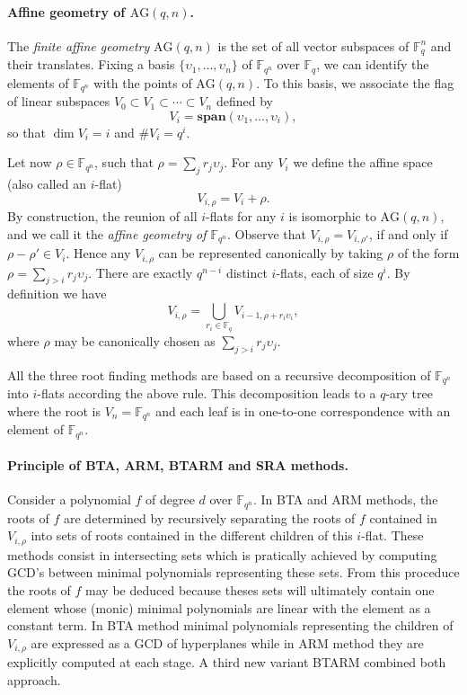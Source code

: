 \documentclass{article}
\newcommand{\ff}[1]{\mathbb{F}_{#1}}
\newcommand{\dd}{d}
\newcommand{\qq}{q}
\newcommand{\nn}{n}
\newcommand{\qn}{{\qq^\nn}}
\newcommand{\basef}{\ff{\qq}}
\newcommand{\extf}{\ff{\qn}}
\newcommand{\AG}{\mathrm{AG}(\qq,\nn)}
\newcommand{\Span}{\mathbf{span}}
\newcommand{\card}[1]{\# #1}
\begin{document}
\paragraph{Affine geometry of $\AG$.} The \emph{finite affine geometry} $\AG$ is the set of all vector subspaces of $\basef^\nn$ and their translates. Fixing a basis $\{\upsilon_1,\ldots,\upsilon_\nn\}$ of $\extf$ over $\basef$, we can
identify the elements of $\extf$ with the points of $\AG$. To this basis, we associate the flag of linear
subspaces $V_0\subset V_1\subset \cdots \subset V_\nn$ defined by
\begin{equation}
  V_i = \Span(\upsilon_1,\dots,\upsilon_i),
\end{equation}
so that $\dim V_i = i$ and $\card V_i = \qq^i$.

Let now $\rho\in\extf$, such that $\rho=\sum_j r_j\upsilon_j$.  For any
$V_i$ we define the affine space (also called an $i$-flat)
\begin{equation}
  V_{i,\rho} = V_i + \rho.
\end{equation}
By construction, the reunion of all $i$-flats for any $i$ is
isomorphic to $\AG$, and we call it the \emph{affine geometry of
  $\extf$}.
Observe that $V_{i,\rho}=V_{i,\rho'}$, if and only if $\rho-\rho'\in V_i$. Hence
any $V_{i,\rho}$ can be represented canonically by taking $\rho$ of
the form $\rho=\sum_{j>i}r_j\upsilon_j$. There are exactly
$\qq^{n-i}$ distinct $i$-flats, each of size $\qq^i$. By definition we have
\begin{equation}
  V_{i,\rho} = \bigcup_{r_i \in\basef} V_{i-1,\rho + r_i \upsilon_i},
\end{equation}
where $\rho$ may be canonically chosen as $\sum_{j>i}r_j\upsilon_j$.

\medskip

\noindent All the three root finding methods are based on a recursive decomposition of $\extf$ into $i$-flats 
according the above rule. This decomposition leads to a $\qq$-ary tree where the root 
is $V_{n}=\extf$ and each leaf is in one-to-one correspondence with an element of $\extf$.

\medskip


\paragraph{Principle of BTA, ARM, BTARM and SRA methods.} Consider a polynomial $f$ of degree $\dd$ over $\extf$. In BTA and ARM methods, the roots of $f$ are determined by recursively separating the roots of $f$ contained in $V_{i,\rho}$ into sets of roots contained in the different children of this $i$-flat. These methods consist in intersecting sets which is pratically achieved by computing GCD's between minimal polynomials representing these sets. From this proceduce the roots of $f$ may be deduced because 
theses sets will ultimately contain one element whose (monic) minimal polynomials are linear with the element as a constant term. In BTA method minimal polynomials representing the children of $V_{i,\rho}$ 
are expressed as a GCD of hyperplanes while in ARM method they are explicitly computed at each stage. A third new variant BTARM combined both approach.
\end{document}
